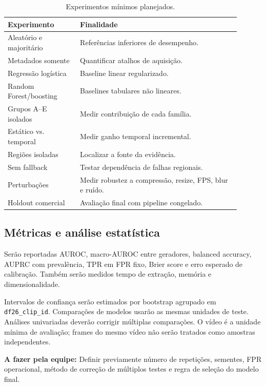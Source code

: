 \documentclass[11pt,a4paper]{article}
\newcommand{\afazer}[1]{%
  \par\smallskip
  \noindent\textcolor{red!70!black}{\textbf{A fazer pela equipe:} #1}
  \par\smallskip
}
\begin{document}
\begin{table}[ht]
  \centering
  \caption{Experimentos mínimos planejados.}
  \label{tab:experimentos}
  \begin{tabular}{p{0.28\linewidth}p{0.62\linewidth}}
    \toprule
    Experimento & Finalidade \\
    \midrule
    Aleatório e majoritário & Referências inferiores de desempenho. \\
    Metadados somente & Quantificar atalhos de aquisição. \\
    Regressão logística & Baseline linear regularizado. \\
    Random Forest/boosting & Baselines tabulares não lineares. \\
    Grupos A--E isolados & Medir contribuição de cada família. \\
    Estático vs. temporal & Medir ganho temporal incremental. \\
    Regiões isoladas & Localizar a fonte da evidência. \\
    Sem fallback & Testar dependência de falhas regionais. \\
    Perturbações & Medir robustez a compressão, resize, FPS, blur e ruído. \\
    Holdout comercial & Avaliação final com pipeline congelado. \\
    \bottomrule
  \end{tabular}
\end{table}

\subsection{Métricas e análise estatística}

Serão reportadas AUROC, macro-AUROC entre geradores, balanced accuracy, AUPRC
com prevalência, TPR em FPR fixo, Brier score e erro esperado de calibração.
Também serão medidos tempo de extração, memória e dimensionalidade.

Intervalos de confiança serão estimados por bootstrap agrupado em
\texttt{df26\_clip\_id}. Comparações de modelos usarão as mesmas unidades de
teste. Análises univariadas deverão corrigir múltiplas comparações. O vídeo é a
unidade mínima de avaliação; frames do mesmo vídeo não serão tratados como
amostras independentes.

\afazer{Definir previamente número de repetições, sementes, FPR operacional,
método de correção de múltiplos testes e regra de seleção do modelo final.}
\end{document}
